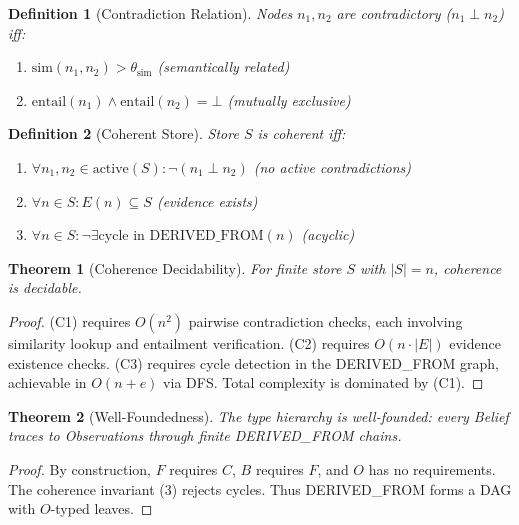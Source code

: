 \documentclass[11pt,a4paper]{article}
\newtheorem{definition}{Definition}[section]
\newtheorem{theorem}{Theorem}[section]
\begin{document}
\begin{definition}[Contradiction Relation]
\label{def:contradiction}
Nodes $n_1, n_2$ are contradictory ($n_1 \perp n_2$) iff:
\begin{enumerate}[noitemsep]
    \item $\text{sim}(n_1, n_2) > \theta_{\text{sim}}$ (semantically related)
    \item $\text{entail}(n_1) \wedge \text{entail}(n_2) = \bot$ (mutually exclusive)
\end{enumerate}
\end{definition}

\begin{definition}[Coherent Store]
\label{def:coherent}
Store $S$ is coherent iff:
\begin{enumerate}[noitemsep]
    \item $\forall n_1, n_2 \in \text{active}(S): \neg(n_1 \perp n_2)$ (no active contradictions)
    \item $\forall n \in S: E(n) \subseteq S$ (evidence exists)
    \item $\forall n \in S: \neg\exists \text{cycle in DERIVED\_FROM}(n)$ (acyclic)
\end{enumerate}
\end{definition}

\begin{theorem}[Coherence Decidability]
\label{thm:coherence}
For finite store $S$ with $|S| = n$, coherence is decidable.
\end{theorem}

\begin{proof}
(C1) requires $O(n^2)$ pairwise contradiction checks, each involving similarity lookup and entailment verification. (C2) requires $O(n \cdot |E|)$ evidence existence checks. (C3) requires cycle detection in the DERIVED\_FROM graph, achievable in $O(n + e)$ via DFS. Total complexity is dominated by (C1).
\end{proof}

\begin{theorem}[Well-Foundedness]
\label{thm:wellfounded}
The type hierarchy is well-founded: every Belief traces to Observations through finite DERIVED\_FROM chains.
\end{theorem}

\begin{proof}
By construction, $F$ requires $C$, $B$ requires $F$, and $O$ has no requirements. The coherence invariant (3) rejects cycles. Thus DERIVED\_FROM forms a DAG with $O$-typed leaves.
\end{proof}
\end{document}
